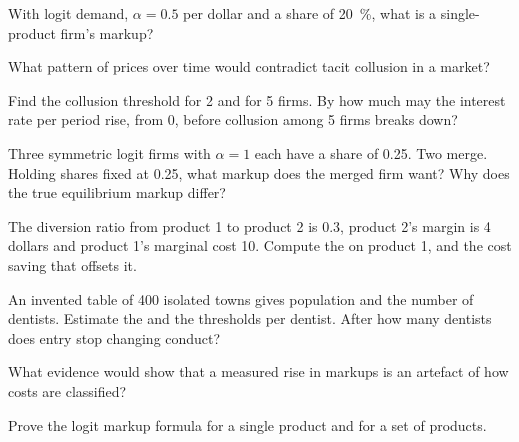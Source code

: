 \begin{exercise}[$\star$]\label{exo:b3:oligopoly-and-collusion:3}
With logit demand, $\alpha = 0.5$ per dollar and a share of 20~\%, what is a single-product firm's markup?
\end{exercise}

\begin{exercise}[$\star$]\label{exo:b3:oligopoly-and-collusion:4}
What pattern of prices over time would contradict tacit collusion in a market?
\end{exercise}

\begin{exercise}[$\star\star$]\label{exo:b3:oligopoly-and-collusion:5}
Find the collusion threshold for 2 and for 5 firms. By how much may the interest rate
per period rise, from 0, before collusion among 5 firms breaks down?
\end{exercise}

\begin{exercise}[$\star\star$]\label{exo:b3:oligopoly-and-collusion:6}
Three symmetric logit firms with $\alpha = 1$ each have a share of 0.25. Two merge. Holding shares fixed
at 0.25, what markup does the merged firm want? Why does the true equilibrium markup
differ?
\end{exercise}

\begin{exercise}[$\star\star$]\label{exo:b3:oligopoly-and-collusion:7}
The diversion ratio from product 1 to product 2 is 0.3, product 2's margin is 4 dollars and
product 1's marginal cost 10. Compute the  on product 1, and the
cost saving that offsets it.
\end{exercise}

\begin{exercise}[$\star\star$]\label{exo:b3:oligopoly-and-collusion:8}
An invented table of 400 isolated towns gives population and the number of dentists.
Estimate the  and the thresholds per dentist. After how many dentists
does entry stop changing conduct?
\end{exercise}

\begin{exercise}[$\star\star$]\label{exo:b3:oligopoly-and-collusion:9}
What evidence would show that a measured rise in markups is an artefact of how costs
are classified?
\end{exercise}

\begin{exercise}[$\star\star\star$]\label{exo:b3:oligopoly-and-collusion:10}
Prove the logit markup formula for a single product and for a set of products.
\end{exercise}


